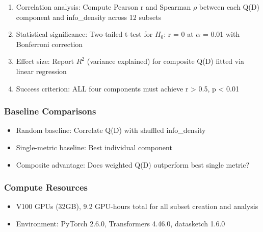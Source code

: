 \begin{enumerate}
\item Correlation analysis: Compute Pearson r and Spearman $\rho$ between each Q(D) component and info\_density across 12 subsets
\item Statistical significance: Two-tailed t-test for $H_0$: r = 0 at $\alpha$ = 0.01 with Bonferroni correction
\item Effect size: Report $R^2$ (variance explained) for composite Q(D) fitted via linear regression
\item Success criterion: ALL four components must achieve r > 0.5, p < 0.01
\end{enumerate}

\subsubsection{Baseline Comparisons}

\begin{itemize}
\item Random baseline: Correlate Q(D) with shuffled info\_density
\item Single-metric baseline: Best individual component
\item Composite advantage: Does weighted Q(D) outperform best single metric?
\end{itemize}

\subsubsection{Compute Resources}

\begin{itemize}
\item V100 GPUs (32GB), 9.2 GPU-hours total for all subset creation and analysis
\item Environment: PyTorch 2.6.0, Transformers 4.46.0, datasketch 1.6.0
\end{itemize}
